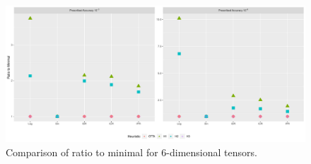 \documentclass[runningheads]{llncs}
\begin{document}
\begin{figure}[!htb]
	\begin{center}
		\includegraphics[scale=0.35]{./ratio_to_minimal-16-6.pdf}
	\end{center}
	\caption{Comparison of ratio to minimal for $6$-dimensional tensors.\label{fig:rtm-6}}
\end{figure}
\end{document}
